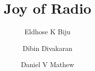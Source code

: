 %

% 

\title{Joy of Radio}

\def\groupMemberA{Daniel V Mathew}
\def\groupMemberB{}
\def\groupMemberC{}
\def\superviser{Prof. Neetha George}
\def\titleA{LOGIC CIRCUIT DESIGN}
\def\titleB{A SIXTEEN BIT ALU}

\author {
    Eldhose K Biju
    \and
    Dibin Divakaran
    \and
    Daniel V Mathew
}



